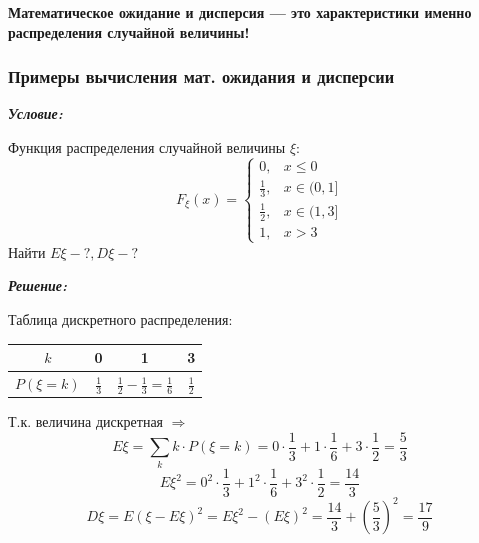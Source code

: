 \begin{center}
	\textbf{Математическое ожидание и дисперсия — это характеристики именно распределения случайной величины!}
\end{center}

\subsubsection{Примеры вычисления мат. ожидания и дисперсии}

\begin{exmp}
	\noindent\textit{\textbf{Условие:}}
	
	Функция распределения случайной величины $\xi$:
	\[
	F_{\xi} (x) =
	\begin{cases}
	0, &x \le 0 \\
	\frac{1}{3}, &x \in (0, 1] \\
	\frac{1}{2}, &x \in (1, 3] \\
	1, &x >3
	\end{cases}
	\]
	Найти $E\xi - ?, D\xi - ?$
	
	\noindent\textit{\textbf{Решение:}}
	
	Таблица дискретного распределения:
	\begin{table}[H]
		\centering\makegapedcells
		\begin{tabular}{|c|c|c|c|}
			\hline
			$k$        & 0             & 1                                     & 3             \\ \hline
			$P(\xi=k)$ & $\frac{1}{3}$ & $\frac{1}{2}-\frac{1}{3}=\frac{1}{6}$ & $\frac{1}{2}$ \\ \hline
		\end{tabular}
	\end{table}
	Т.к. величина дискретная $\Rightarrow$
	\[
	E\xi = \sum_{k} k \cdot P(\xi = k) = 0 \cdot \frac{1}{3} + 1 \cdot \frac{1}{6} + 3 \cdot \frac{1}{2} = \frac{5}{3}
	\]
	\[
	E\xi^2 = 0^2 \cdot \frac{1}{3} + 1^2 \cdot \frac{1}{6} + 3^2 \cdot \frac{1}{2} = \frac{14}{3}
	\]
	\[
	D\xi = E(\xi - E\xi)^2 = E\xi^2 - (E\xi)^2 = \frac{14}{3} + \left( \frac{5}{3} \right)^2 = \frac{17}{9}
	\]
\end{exmp}

